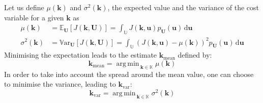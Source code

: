 \documentclass[preprint, 1p]{elsarticle}
\DeclareMathOperator*{\argmin}{arg\,min \,}
\newcommand{\Var}{\mathbb{V}\textrm{ar}}
\newcommand{\Ex}{\mathbb{E}}
\newcommand{\Prob}{\mathbb{P}}
\newcommand{\kmean}{{\mathbf{k}}_{\mathrm{mean}}}
\newcommand{\kvar}{{\mathbf{k}}_{\mathrm{var}}}
\newcommand{\Kspace}{\mathbb{K}}
\newcommand{\Uspace}{\mathbb{U}}
\begin{document}
Let us define $\mu(\mathbf{k})$ and $\sigma^2(\mathbf{k})$, the expected value and the variance of the cost variable  for a given $\mathbf{k}$ as 
\begin{align}
  \label{eq:def_mu}
  \mu(\mathbf{k}) &= \Ex_{\mathbf{U}}\left[J(\mathbf{k},\mathbf{U})\right] = %
   \int_{\Uspace} J(\mathbf{k},\mathbf{u})p_{\mathbf{U}}(\mathbf{u}) \, \mathrm{d}\mathbf{u} \\
  \label{eq:def_sigma2}
  \sigma^2(\mathbf{k}) &= \Var_{\mathbf{U}}\left[J(\mathbf{k},\mathbf{U})\right] 
   =\int_{\Uspace} \left(J(\mathbf{k},\mathbf{u}) - \mu(\mathbf{k})\right)^2 p_{\mathbf{U}}(\mathbf{u})\, \mathrm{d}\mathbf{u}
\end{align} 
%
Minimising the expectation leads to the estimate $\kmean$ defined by:
\begin{equation}
  \label{eq:stoch_opt_def_mean}
  \kmean = \argmin_{\mathbf{k}\in\Kspace} \mu(\mathbf{k})
\end{equation}
In order to take into account the spread around the mean value, one can choose to minimise the variance, leading to $\kvar$:
\begin{equation}
  \label{eq:stoch_opt_def_var}
  \kvar = \argmin_{\mathbf{k} \in \Kspace} \sigma^2(\mathbf{k})
\end{equation}
\end{document}
